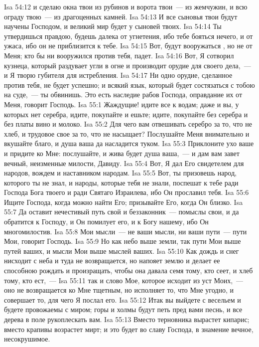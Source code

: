 \vs Isa 54:12 и сделаю окна твои из рубинов и ворота твои~--- из жемчужин, и всю ограду твою~--- из драгоценных камней.
\vs Isa 54:13 И все сыновья твои будут научены Господом, и великий мир будет у сыновей твоих.
\vs Isa 54:14 Ты утвердишься правдою, будешь далека от угнетения, ибо тебе бояться нечего, и от ужаса, ибо он не приблизится к тебе.
\vs Isa 54:15 Вот, будут вооружаться , но не от Меня; кто бы ни вооружился против тебя, падет.
\vs Isa 54:16 Вот, Я сотворил кузнеца, который раздувает угли в огне и производит орудие для своего дела,~--- и Я творю губителя для истребления.
\vs Isa 54:17 Ни одно орудие, сделанное против тебя, не будет успешно; и всякий язык, который будет состязаться с тобою на суде,~--- ты обвинишь. Это есть наследие рабов Господа, оправдание их от Меня, говорит Господь.
\vs Isa 55:1 Жаждущие! идите все к водам; даже и вы, у которых нет серебра, идите, покупайте и ешьте; идите, покупайте без серебра и без платы вино и молоко.
\vs Isa 55:2 Для чего вам отвешивать серебро за то, что не хлеб, и трудовое свое за то, что не насыщает? Послушайте Меня внимательно и вкушайте благо, и душа ваша да насладится туком.
\vs Isa 55:3 Приклоните ухо ваше и придите ко Мне: послушайте, и жива будет душа ваша,~--- и дам вам завет вечный, неизменные милости,  Давиду.
\vs Isa 55:4 Вот, Я дал Его свидетелем для народов, вождем и наставником народам.
\vs Isa 55:5 Вот, ты призовешь народ, которого ты не знал, и народы, которые тебя не знали, поспешат к тебе ради Господа Бога твоего и ради Святаго Израилева, ибо Он прославил тебя.
\rsbpar\vs Isa 55:6 Ищите Господа, когда можно найти Его; призывайте Его, когда Он близко.
\vs Isa 55:7 Да оставит нечестивый путь свой и беззаконник~--- помыслы свои, и да обратится к Господу, и Он помилует его, и к Богу нашему, ибо Он многомилостив.
\vs Isa 55:8 Мои мысли~--- не ваши мысли, ни ваши пути~--- пути Мои, говорит Господь.
\vs Isa 55:9 Но как небо выше земли, так пути Мои выше путей ваших, и мысли Мои выше мыслей ваших.
\vs Isa 55:10 Как дождь и снег нисходит с неба и туда не возвращается, но напояет землю и делает ее способною рождать и произращать, чтобы она давала семя тому, кто сеет, и хлеб тому, кто ест,~---
\vs Isa 55:11 так и слово Мое, которое исходит из уст Моих,~--- оно не возвращается ко Мне тщетным, но исполняет то, что Мне угодно, и совершает то, для чего Я послал его.
\vs Isa 55:12 Итак вы выйдете с весельем и будете провожаемы с миром; горы и холмы будут петь пред вами песнь, и все дерева в поле рукоплескать вам.
\vs Isa 55:13 Вместо терновника вырастет кипарис; вместо крапивы возрастет мирт; и это будет во славу Господа, в знамение вечное, несокрушимое.
